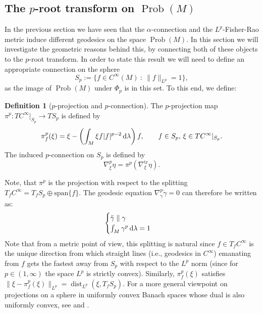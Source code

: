 \documentclass[11pt]{amsart}
\theoremstyle{definition}
\newtheorem{definition}[theorem]{Definition}
\DeclareMathOperator{\dist}{dist}
\newcommand{\dx}{\lambda}
\newcommand{\Prob}{\operatorname{Prob}(M)}
\newcommand{\ntr}{\nabla^{\text{tr}}}
\newcommand{\ud}{\textup{d}}
\begin{document}
\subsection{The $p$-root transform on $\Prob$}
In the previous section we have seen that the $\alpha$-connection and the $L^p$-Fisher-Rao metric induce different geodesics on the space $\Prob$. In this section we will investigate the geometric reasons behind this, by connecting both of these objects to the $p$-root transform.
In order to state this result we will need to define an appropriate connection on the sphere 
\[
S_p := \{ f\in C^{\infty}(M) ~:~ \|f\|_{L^p} = 1\},
\]
as the image of $\Prob$ under $\Phi_p$ is in this set.
To this end, we define:
\begin{definition}[$p$-projection and $p$-connection]
The $p$-projection map $\pi^p: TC^\infty|_{S_p} \to TS_p$ is defined by
\[
\pi^p_f(\xi) = \xi - \left(\int_M \xi f |f|^{p-2}\,\ud\dx\right)f, \qquad f\in S_p,\, \xi\in TC^\infty|_{S_p}.
\]
The induced $p$-connection on $S_p$ is defined by
\[
\nabla^p_\xi\eta = \pi^p \left( \ntr_\xi\eta\right).
\]
\end{definition}
Note, that $\pi^p$ is the projection with respect to the splitting $T_fC^\infty = T_f S_p \oplus \text{span}\{f\}$.
The geodesic equation $\nabla^p_{\dot\gamma}\dot\gamma = 0$ can therefore be written as:
\begin{equation}\label{eq:geod_nabla_p}
\begin{cases}
    \ddot\gamma \parallel \gamma \\
    \int_M \gamma^p \,\ud\dx = 1
\end{cases}
\end{equation}
Note that from a metric point of view, this splitting is natural since $f\in T_fC^\infty$ is the unique direction from which straight lines (i.e., geodesics in $C^\infty$) emanating from $f$ gets the fastest away from $S_p$ with respect to the $L^p$ norm (since for $p\in (1,\infty)$ the space $L^p$ is strictly convex).
Similarly, $\pi^p_f(\xi)$ satisfies $\|\xi - \pi^p_f(\xi)\|_{L^p} = \dist_{L^p} (\xi, T_fS_p)$.
For a more general viewpoint on projections on a sphere in uniformly convex Banach spaces whose dual is also uniformly convex, see \cite{gibilisco1999connections} and \cite[Prop.~2]{gibilisco2020p}.
\end{document}
